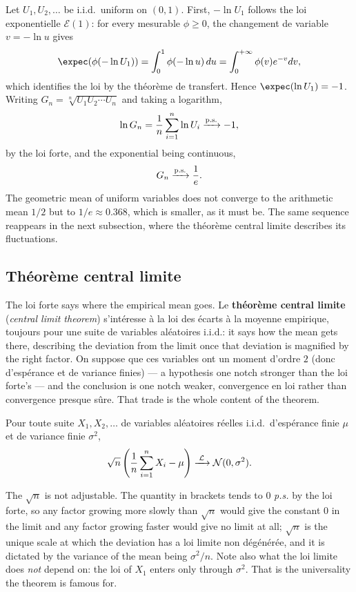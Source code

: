 \begin{example}
  Let $U_{1}, U_{2}, \dots$ be i.i.d.\ uniform on $(0,1)$. First,
  $-\ln U_{1}$ follows the loi exponentielle $\mathcal{E}(1)$: for every
  mesurable $\phi \geq 0$, the changement de variable $v = -\ln u$ gives
  \[
    \expec(\phi(-\ln U_{1})) = \int_{0}^{1} \phi(-\ln u)\, du
      = \int_{0}^{+\infty} \phi(v) e^{-v} dv ,
  \]
  which identifies the loi by the théorème de transfert. Hence
  $\expec(\ln U_{1}) = -1$. Writing $G_{n} = \sqrt[n]{U_{1}U_{2}\cdots U_{n}}$
  and taking a logarithm,
  \[
    \ln G_{n} = \frac{1}{n}\sum_{i=1}^{n} \ln U_{i} \xrightarrow{\text{p.s.}} -1 ,
  \]
  by the loi forte, and the exponential being continuous,
  \[
    G_{n} \xrightarrow{\text{p.s.}} \frac{1}{e} .
  \]
  The geometric mean of uniform variables does not converge to the arithmetic
  mean $1/2$ but to $1/e \approx 0.368$, which is smaller, as it must be. The
  same sequence reappears in the next subsection, where the théorème central
  limite describes its fluctuations.
\end{example}

\subsection{Théorème central limite}
The loi forte says where the empirical mean goes. Le \textbf{théorème central
limite} (\textit{central limit theorem}) s'intéresse à la loi des écarts à la
moyenne empirique, toujours pour une suite de variables aléatoires i.i.d.: it
says how the mean gets there, describing the deviation from the limit once that
deviation is magnified by the right factor. On suppose que ces variables ont un
moment d'ordre $2$ (donc d'espérance et de variance finies) --- a hypothesis
one notch stronger than the loi forte's --- and the conclusion is one notch
weaker, convergence en loi rather than convergence presque sûre. That trade is
the whole content of the theorem.

\begin{theorem}
  Pour toute suite $X_{1}, X_{2}, \dots$ de variables aléatoires réelles
  i.i.d.\ d'espérance finie $\mu$ et de variance finie $\sigma^{2}$,
  \[
    \sqrt{n}\left(\frac{1}{n}\sum_{i=1}^{n} X_{i} - \mu\right)
      \xrightarrow{\;\mathcal{L}\;} \mathcal{N}(0, \sigma^{2}) .
  \]
\end{theorem}

\begin{remark}
  The $\sqrt{n}$ is not adjustable. The quantity in brackets tends to $0$
  \textit{p.s.} by the loi forte, so any factor growing more slowly than
  $\sqrt{n}$ would give the constant $0$ in the limit and any factor growing
  faster would give no limit at all; $\sqrt{n}$ is the unique scale at which the
  deviation has a loi limite non dégénérée, and it is dictated by the variance
  of the mean being $\sigma^{2}/n$. Note also what the loi limite does
  \emph{not} depend on: the loi of $X_{1}$ enters only through
  $\sigma^{2}$.
  That is the universality the theorem is famous for.
\end{remark}

